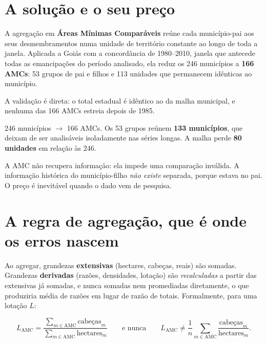 \section{A solução e o seu preço}

A agregação em \textbf{Áreas Mínimas Comparáveis} reúne cada município-pai aos
seus desmembramentos numa unidade de território constante ao longo de toda a
janela. Aplicada a Goiás com a concordância de 1980--2010, janela que antecede
todas as emancipações do período analisado, ela reduz os 246 municípios a
\textbf{166 AMCs}: 53 grupos de pai e filhos e 113 unidades que permanecem
idênticas ao município.

A validação é direta: o total estadual é idêntico ao da malha municipal, e
nenhuma das 166 AMCs estreia depois de 1985.

\begin{ancora}
246 municípios $\to$ 166 AMCs. Os 53 grupos reúnem \textbf{133 municípios}, que
deixam de ser analisáveis isoladamente nas séries longas. A malha perde
\textbf{80 unidades} em relação às 246.
\end{ancora}

\begin{naodiz}
A AMC não recupera informação: ela impede uma comparação inválida. A informação
histórica do município-filho \emph{não existe} separada, porque estava no pai. O
preço é inevitável quando o dado vem de pesquisa.
\end{naodiz}

\section{A regra de agregação, que é onde os erros nascem}

Ao agregar, grandezas \textbf{extensivas} (hectares, cabeças, reais) são
somadas. Grandezas \textbf{derivadas} (razões, densidades, lotação) são
\emph{recalculadas} a partir das extensivas já somadas, e nunca somadas nem
promediadas diretamente, o que produziria média de razões em lugar de razão
de totais. Formalmente, para uma lotação $L$:

\begin{equation}
L_{\text{AMC}} = \frac{\sum_{m \in \text{AMC}} \text{cabeças}_m}{\sum_{m \in \text{AMC}} \text{hectares}_m}
\qquad\text{e nunca}\qquad
L_{\text{AMC}} \neq \frac{1}{n}\sum_{m \in \text{AMC}} \frac{\text{cabeças}_m}{\text{hectares}_m}.
\end{equation}

